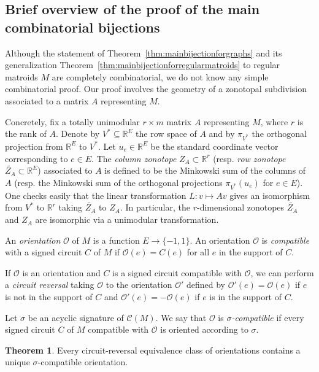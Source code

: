 \documentclass[12pt]{amsart}
\newcommand{\RR}{\mathbb{R}}
\numberwithin{equation}{section}
\theoremstyle{definition}
\newtheorem{theorem}{Theorem}[subsection]
\begin{document}
\subsection{Brief overview of the proof of the main combinatorial bijections} \label{sec:brief_overview}

Although the statement of Theorem~\ref{thm:mainbijectionforgraphs} and its generalization Theorem~\ref{thm:mainbijectionforregularmatroids} to regular matroids $M$ are completely combinatorial, we do not know any simple combinatorial proof.  Our proof involves the geometry of a zonotopal subdivision associated to a matrix $A$ representing $M$.

Concretely, fix a totally unimodular $r \times m$ matrix $A$ representing $M$, where $r$ is the rank of $A$. Denote by $V^* \subseteq \RR^E$ the row space of $A$ and by $\pi_{V^*}$ the orthogonal projection from $\RR^E$ to $V^*$. Let $u_e \in \RR^E$ be the standard coordinate vector corresponding to $e \in E$.  The {\em column zonotope} $Z_A \subset \RR^r$ (resp. {\em row zonotope} $\widetilde{Z_A} \subset \RR^E$) associated to $A$ is defined to be the Minkowski sum of the columns of $A$ (resp. the Minkowski sum of the orthogonal projections $\pi_{V^*}(u_e)$ for $e \in E$).
One checks easily that the linear transformation $L : v \mapsto Av$ gives an isomorphism from $V^*$ to $\RR^r$ taking $\widetilde{Z_A}$ to $Z_A$.
In particular, the $r$-dimensional zonotopes $\widetilde{Z_A}$ and $Z_A$ are isomorphic via a unimodular transformation.

An {\em orientation} $\mathcal{O}$ of $M$ is a function $E \to \{ -1, 1 \}$.
An orientation $\mathcal{O}$ is {\em compatible} with a signed circuit $C$ of $M$ if $\mathcal{O}(e) = C(e)$ for all $e$ in the support of $C$.

If $\mathcal{O}$ is an orientation and $C$ is a signed circuit compatible with $\mathcal{O}$, we can perform a {\em circuit reversal} taking $\mathcal{O}$ to the orientation $\mathcal{O}'$ 
defined by $\mathcal{O}'(e) = \mathcal{O}(e)$ if $e$ is not in the support of $C$ and $\mathcal{O}'(e) = -\mathcal{O}(e)$ if $e$ is in the support of $C$.

Let $\sigma$ be an acyclic signature of ${\mathcal C}(M)$.
We say that $\mathcal{O}$ is {\em $\sigma$-compatible} if every signed circuit $C$ of $M$ compatible with $\mathcal{O}$ is oriented according to $\sigma$.

\begin{theorem}
Every circuit-reversal equivalence class of orientations contains a unique $\sigma$-compatible orientation.
\end{theorem}
\end{document}
